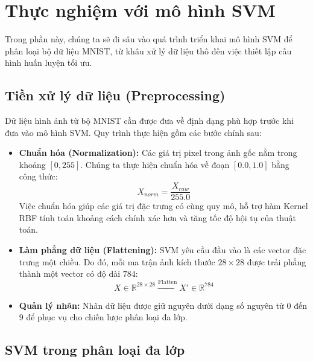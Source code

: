 \documentclass[../DoAn.tex]{subfiles}
\begin{document}
\section{Thực nghiệm với mô hình SVM}

Trong phần này, chúng ta sẽ đi sâu vào quá trình triển khai mô hình SVM để phân loại bộ dữ liệu MNIST, từ khâu xử lý dữ liệu thô đến việc thiết lập cấu hình huấn luyện tối ưu.\\

\subsection{Tiền xử lý dữ liệu (Preprocessing)}

Dữ liệu hình ảnh từ bộ MNIST cần được đưa về định dạng phù hợp trước khi đưa vào mô hình SVM. Quy trình thực hiện gồm các bước chính sau:

\begin{itemize}
    \item \textbf{Chuẩn hóa (Normalization):} Các giá trị pixel trong ảnh gốc nằm trong khoảng $[0, 255]$. Chúng ta thực hiện chuẩn hóa về đoạn $[0.0, 1.0]$ bằng công thức:
    \begin{equation}
        X_{norm} = \frac{X_{raw}}{255.0}
    \end{equation}
    Việc chuẩn hóa giúp các giá trị đặc trưng có cùng quy mô, hỗ trợ hàm Kernel RBF tính toán khoảng cách chính xác hơn và tăng tốc độ hội tụ của thuật toán.
    
    \item \textbf{Làm phẳng dữ liệu (Flattening):} SVM yêu cầu đầu vào là các vector đặc trưng một chiều. Do đó, mỗi ma trận ảnh kích thước $28 \times 28$ được trải phẳng thành một vector có độ dài $784$:
    \begin{equation}
        X \in \mathbb{R}^{28 \times 28} \xrightarrow{\text{Flatten}} X' \in \mathbb{R}^{784}
    \end{equation}
    
    \item \textbf{Quản lý nhãn:} Nhãn dữ liệu được giữ nguyên dưới dạng số nguyên từ $0$ đến $9$ để phục vụ cho chiến lược phân loại đa lớp.\\
\end{itemize}

\subsection{SVM trong phân loại đa lớp}
\end{document}
